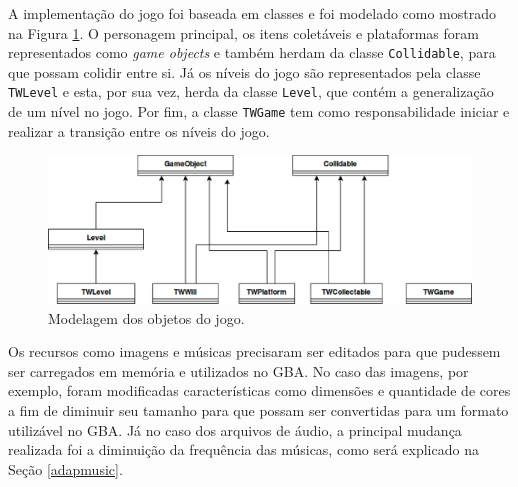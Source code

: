     A implementação do jogo foi baseada em classes e foi modelado como mostrado na Figura \ref{model-final}. O personagem principal, os itens coletáveis e plataformas foram representados como \textit{game objects} e também herdam da classe \texttt{Collidable}, para que possam colidir entre si. Já os níveis do jogo são representados pela classe \texttt{TWLevel} e esta, por sua vez, herda da classe \texttt{Level}, que contém a generalização de um nível no jogo. Por fim, a classe \texttt{TWGame} tem como responsabilidade iniciar e realizar a transição entre os níveis do jogo.

    \begin{figure}[H]
      \centering \includegraphics[keepaspectratio=true,scale=0.6]{figuras/modelagem-final.eps}
      \caption[Modelagem dos objetos do jogo]
        {Modelagem dos objetos do jogo.}
      \label{model-final}
    \end{figure}

    Os recursos como imagens e músicas precisaram ser editados para que pudessem ser carregados em memória e utilizados no GBA. No caso das imagens, por exemplo, foram modificadas características como dimensões e quantidade de cores a fim de diminuir seu tamanho para que possam ser convertidas para um formato utilizável no GBA. Já no caso dos arquivos de áudio, a principal mudança realizada foi a diminuição da frequência das músicas, como será explicado na Seção \ref{adapmusic}.